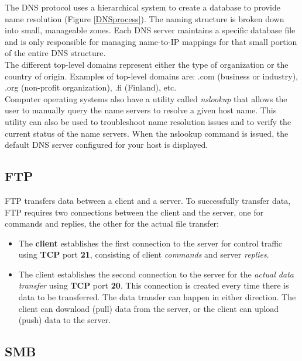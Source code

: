 The DNS protocol uses a hierarchical system to create a database to provide name resolution (Figure \ref{DNSprocess}). The naming structure is broken down into small, manageable zones. Each DNS server maintains a specific database file and is only responsible for managing name-to-IP mappings for that small portion of the entire DNS structure.\\

The different top-level domains represent either the type of organization or the country of origin. Examples of top-level domains are: .com (business or industry), .org (non-profit organization), .fi (Finland), etc.\\

Computer operating systems also have a utility called \emph{nslookup} that allows the user to manually query the name servers to resolve a given host name. This utility can also be used to troubleshoot name resolution issues and to verify the current status of the name servers. When the nslookup command is issued, the default DNS server configured for your host is displayed. 

\subsection{FTP}

FTP transfers data between a client and a server. To successfully transfer data, FTP requires two connections between the client and the server, one for commands and replies, the other for the actual file transfer:

\begin{itemize}
\item The \textbf{client} establishes the first connection to the server for control traffic using \textbf{TCP} port \textbf{21}, consisting of client \emph{commands} and server \emph{replies}.

\item The client establishes the second connection to the server for the \emph{actual data transfer} using \textbf{TCP} port \textbf{20}. This connection is created every time there is data to be transferred. The data transfer can happen in either direction. The client can download (pull) data from the server, or the client can upload (push) data to the server.
\end{itemize}

\subsection{SMB}

